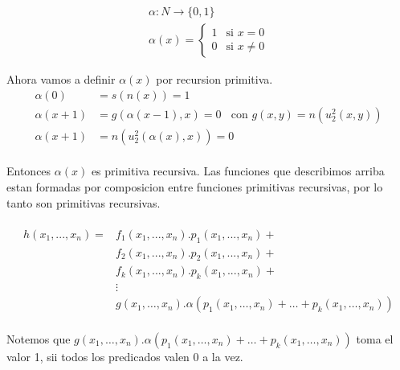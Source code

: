\documentclass{report}
\begin{document}
\[
\begin{aligned}
\alpha:N\rightarrow\{0,1\}\\
\alpha(x)=\begin{cases}
1 & \text{si } x=0\\
0 & \text{si } x\neq0
\end{cases}
\end{aligned}
\]

Ahora vamos a definir $\alpha(x)$ por recursion primitiva.\\

$$\begin{aligned}
	\alpha(0)&=s(n(x))=1\\
	\alpha(x+1)&=g(\alpha(x-1),x)=0 \ \ \ \ \text{con\ } g(x,y) = n(u_2^2(x,y)) \\
	\alpha(x+1)&=n(u_{2}^{2}(\alpha(x),x))=0
\end{aligned}$$\\

Entonces $\alpha(x)$ es primitiva recursiva.
Las funciones que describimos arriba estan formadas por composicion entre funciones primitivas recursivas, por lo tanto son primitivas recursivas.\\





\sol \\
$$\begin{aligned}
h(x_1,...,x_n) = &f_{1}(x_{1},...,x_{n}).p_{1}(x_{1},...,x_{n})+ \\
&f_2(x_1,...,x_n).p_2(x_1,...,x_n)+ \\
&f_k(x_1,...,x_n).p_k(x_1,...,x_n)+ \\
& \vdots \\
&g(x_1,\ldots,x_n).\alpha(p_1(x_1,\ldots,x_n)+\ldots+p_k(x_1,\ldots,x_n))
\end{aligned}$$
\\
Notemos que $g(x_1,\ldots,x_n).\alpha(p_1(x_1,\ldots,x_n)+\ldots+p_k(x_1,\ldots,x_n))$ toma el valor 1, sii todos los predicados valen 0 a la vez.
\end{document}
